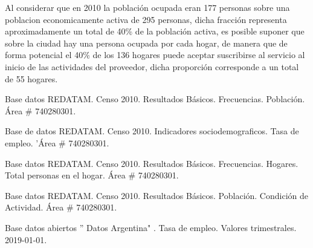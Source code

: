 Al considerar que en 2010 la población ocupada eran 177 personas \cite{censo2010-actividad} sobre una poblacion economicamente activa de 295 personas, dicha fracción representa aproximadamente un total de 40\% de la población activa, es posible suponer que sobre la ciudad hay una persona ocupada por cada hogar, de manera que de forma potencial el 40\% de los 136 hogares puede aceptar suscribirse al servicio al inicio de las actividades del proveedor, dicha proporción corresponde a un total de 55 hogares. 






\newpage

\begin{thebibliography}{99}

 Base datos REDATAM. Censo 2010. Resultados Básicos. Frecuencias. Población. Área \# 740280301.

Base de datos REDATAM. Censo 2010. Indicadores sociodemograficos. Tasa de empleo. 'Área \# 740280301.

 Base datos REDATAM. Censo 2010. Resultados Básicos. Frecuencias. Hogares. Total personas en el hogar. Área \# 740280301.

 Base datos REDATAM. Censo 2010. Resultados Básicos. Población. Condición de Actividad. Área \# 740280301.

 Base datos abiertos '' Datos Argentina" . Tasa de empleo. Valores trimestrales. 2019-01-01.


\end{thebibliography}

\newpage